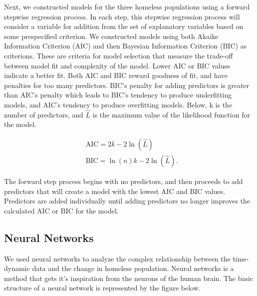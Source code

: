 \documentclass[11pt,letterpaper]{article}
\begin{document}
Next, we constructed models for the three homeless populations using a forward stepwise regression process. In each step, this stepwise regression process will consider a variable for addition from the set of explanatory variables based on some prespecified criterion. We constructed models using both Akaike Information Criterion (AIC) and then Bayesian Information Criterion (BIC) as criterions. These are criteria for model selection that measure the trade-off between model fit and complexity of the model.  Lower AIC or BIC values indicate a better fit. Both AIC and BIC reward goodness of fit, and have penalties for too many predictors. BIC’s penalty for adding predictors is greater than AIC’s penalty which leads to BIC’s tendency to produce underfitting models, and AIC’s tendency to produce overfitting models. Below, k is the number of predictors, and $\hat L$ is the maximum value of the likelihood function for the model.

\begin{align}
    &\mathrm {AIC} =2k-2\ln({\hat {L}})\\
    &\mathrm {BIC} ={\ln(n)k-2\ln({\hat {L}})}.\ 
\end{align}

The forward step process begins with no predictors, and then proceeds to add predictors that will create a model with the lowest AIC and BIC values. Predictors are added individually until adding predictors no longer improves the calculated AIC or BIC for the model.

\subsection{Neural Networks}

We used neural networks to analyze the complex relationship between the time-dynamic data and the change in homeless population. Neural networks is a method that gets it's inspiration from the neurons of the human brain. The basic structure of a neural network is represented by the figure below. 

\def\layersep{2.5cm}
\end{document}
